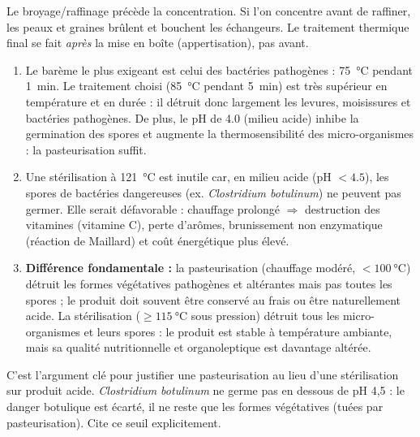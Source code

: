 \documentclass[11pt]{article}
\begin{document}
\begin{attention}
Le broyage/raffinage précède la concentration. Si l'on concentre avant de raffiner, les peaux et graines brûlent et bouchent les échangeurs. Le traitement thermique final se fait \emph{après} la mise en boîte (appertisation), pas avant.
\end{attention}

\begin{corrige}
\begin{enumerate}
\item Le barème le plus exigeant est celui des bactéries pathogènes : \SI{75}{\celsius} pendant \SI{1}{min}. Le traitement choisi (\SI{85}{\celsius} pendant \SI{5}{min}) est très supérieur en température et en durée : il détruit donc largement les levures, moisissures et bactéries pathogènes. De plus, le pH de \num{4,0} (milieu acide) inhibe la germination des spores et augmente la thermosensibilité des micro-organismes : la pasteurisation suffit.
\item Une stérilisation à \SI{121}{\celsius} est inutile car, en milieu acide (pH $< \num{4,5}$), les spores de bactéries dangereuses (ex. \emph{Clostridium botulinum}) ne peuvent pas germer. Elle serait défavorable : chauffage prolongé $\Rightarrow$ destruction des vitamines (vitamine C), perte d'arômes, brunissement non enzymatique (réaction de Maillard) et coût énergétique plus élevé.
\item \textbf{Différence fondamentale :} la pasteurisation (chauffage modéré, $< \SI{100}{\celsius}$) détruit les formes végétatives pathogènes et altérantes mais pas toutes les spores ; le produit doit souvent être conservé au frais ou être naturellement acide. La stérilisation ($\geq \SI{115}{\celsius}$ sous pression) détruit tous les micro-organismes et leurs spores : le produit est stable à température ambiante, mais sa qualité nutritionnelle et organoleptique est davantage altérée.
\end{enumerate}
\end{corrige}

\begin{attention}[Argumentaire « pH < 4,5 »]
C'est l'argument clé pour justifier une pasteurisation au lieu d'une stérilisation sur produit acide. \emph{Clostridium botulinum} ne germe pas en dessous de pH 4,5 : le danger botulique est écarté, il ne reste que les formes végétatives (tuées par pasteurisation). Cite ce seuil explicitement.
\end{attention}
\end{document}
